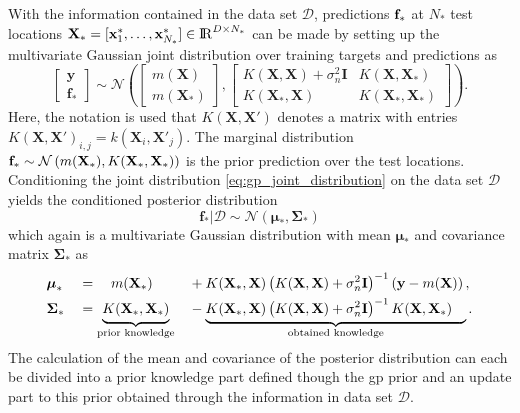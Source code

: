 With the information contained in the data set $\mathcal{D}$, predictions $\mathrm{\mathbf{f}}_*$ at $N_*$ test locations ${\mathbf{X}_* = [\mathrm{\mathbf{x}}^*_{1}, \dots ,\mathrm{\mathbf{x}}^*_{N_*}] \in \mathrm{I\!R}^{D \times N_*}}$ can be made by setting up the multivariate Gaussian joint distribution over training targets and predictions as
\begin{equation}
    \left[ \begin{array}{c}
    \mathbf{y}\\ 
    \mathbf{f_*} 
    \end{array}\right] \sim \mathcal{N} \left( \left[ \begin{array}{c}
    m(\mathbf{X})\\ 
    m(\mathbf{X}_*)
    \end{array}\right], \left[\begin{array}{cc}
    K(\mathbf{X},\mathbf{X}) + \sigma_n^2 \mathbf{I} & K(\mathbf{X},\mathbf{X}_*) \\ 
    K(\mathbf{X}_*,\mathbf{X}) & K(\mathbf{X}_*,\mathbf{X}_*)
    \end{array}\right] \right).
    \label{eq:gp_joint_distribution}
\end{equation}
Here, the notation is used that $K(\mathbf{X}, \mathbf{X}')$ denotes a matrix with entries $K(\mathbf{X}, \mathbf{X}')_{i,j} = k(\mathbf{X}_i, \mathbf{X}'_j)$. The marginal distribution $\mathrm{\mathbf{f}}_* \sim \mathcal{N}\left(m(\mathbf{X}_*), K(\mathbf{X}_*,\mathbf{X}_*) \right)$ is the prior prediction over the test locations. Conditioning the joint distribution \eqref{eq:gp_joint_distribution} on the data set $\mathcal{D}$ yields the conditioned posterior distribution
\begin{equation}
    \mathbf{f_*} | \mathcal{D} \sim \mathcal{N}(\boldsymbol\mu_*, \boldsymbol\Sigma_*) \label{eq:posterior_distribution}
\end{equation}
which again is a multivariate Gaussian distribution with mean $\boldsymbol\mu_*$ and covariance matrix $\boldsymbol\Sigma_*$ as
\begin{alignat}{3}
    &\boldsymbol\mu_* &&= \quad m(\mathbf{X}_*) &&+ K(\mathbf{X}_*,\mathbf{X}) \left(K(\mathbf{X},\mathbf{X})+ \sigma_n^2 \mathbf{I} \right)^{-1} \left(\mathbf{y} - m(\mathbf{X}) \right), \label{eq:gp_mean}\\
    &\boldsymbol\Sigma_* &&= \underbrace{\vphantom{\left(K(\mathbf{X},\mathbf{X})+ \sigma_n^2 \mathbf{I} \right)^{-1}}K(\mathbf{X}_*,\mathbf{X}_*)}_\text{prior knowledge} &&- \underbrace{K(\mathbf{X}_*,\mathbf{X}) \left(K(\mathbf{X},\mathbf{X})+ \sigma_n^2 \mathbf{I} \right)^{-1} K(\mathbf{X},\mathbf{X}_*)\quad}_\text{obtained knowledge}. \label{eq:gp_cov}
\end{alignat}
The calculation of the mean and covariance of the posterior distribution can each be divided into a prior knowledge part defined though the \gls{gp} prior and an update part to this prior obtained through the information in data set $\mathcal{D}$.

